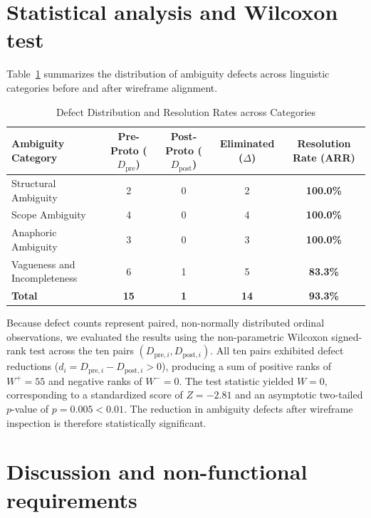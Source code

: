 \documentclass[11pt,a4paper]{article}
\begin{document}
\section{Statistical analysis and Wilcoxon test}

Table~\ref{tab:statistical_summary} summarizes the distribution of ambiguity defects across linguistic categories before and after wireframe alignment.

\begin{table}[htbp]
\centering
\small
\caption{Defect Distribution and Resolution Rates across Categories}
\label{tab:statistical_summary}
\begin{tabular}{l c c c c}
\toprule
\textbf{Ambiguity Category} & \textbf{Pre-Proto ($D_{\text{pre}}$)} & \textbf{Post-Proto ($D_{\text{post}}$)} & \textbf{Eliminated ($\Delta$)} & \textbf{Resolution Rate (ARR)} \\
\midrule
Structural Ambiguity           & 2  & 0 & 2  & \textbf{100.0\%} \\
Scope Ambiguity                & 4  & 0 & 4  & \textbf{100.0\%} \\
Anaphoric Ambiguity            & 3  & 0 & 3  & \textbf{100.0\%} \\
Vagueness and Incompleteness   & 6  & 1 & 5  & \textbf{83.3\%}  \\
\midrule
\textbf{Total}                 & \textbf{15} & \textbf{1} & \textbf{14} & \textbf{93.3\%} \\
\bottomrule
\end{tabular}
\end{table}

Because defect counts represent paired, non-normally distributed ordinal observations, we evaluated the results using the non-parametric Wilcoxon signed-rank test across the ten pairs $(D_{\text{pre}, i}, D_{\text{post}, i})$. All ten pairs exhibited defect reductions ($d_i = D_{\text{pre}, i} - D_{\text{post}, i} > 0$), producing a sum of positive ranks of $W^+ = 55$ and negative ranks of $W^- = 0$. The test statistic yielded $W = 0$, corresponding to a standardized score of $Z = -2.81$ and an asymptotic two-tailed $p$-value of $p = 0.005 < 0.01$. The reduction in ambiguity defects after wireframe inspection is therefore statistically significant.

\section{Discussion and non-functional requirements}
\end{document}
